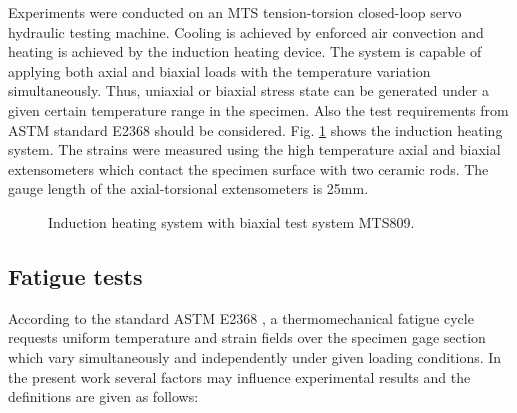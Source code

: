 \documentclass[preprint,5p,twocolumn,11pt,sort&compress]{elsarticle}
\begin{document}

Experiments were conducted on an MTS tension-torsion closed-loop servo hydraulic testing machine. Cooling is achieved by enforced air convection and heating is achieved by the induction heating device. The system is capable of applying both axial and biaxial loads with the temperature variation simultaneously. Thus, uniaxial or biaxial stress state can be generated under a given certain temperature range in the specimen. Also the test requirements from ASTM standard E2368 \cite{ASTM2014a} should be considered. Fig. \ref{Fig:Equipments} shows the induction heating system. The strains were measured using the high temperature axial and biaxial extensometers which contact the specimen surface with two ceramic rods. The gauge length of the axial-torsional extensometers is 25mm.

\begin{figure}[!htp]
\caption{Induction heating system with biaxial test system MTS809.}
\label{Fig:Equipments}
\end{figure}

\subsection{Fatigue tests}
According to the standard ASTM E2368 \cite{ASTM2014a}, a thermomechanical fatigue cycle requests uniform temperature and strain fields over the specimen gage section which vary simultaneously and independently under given loading conditions. In the present work several factors may influence experimental results and the definitions are given as follows:
\end{document}
